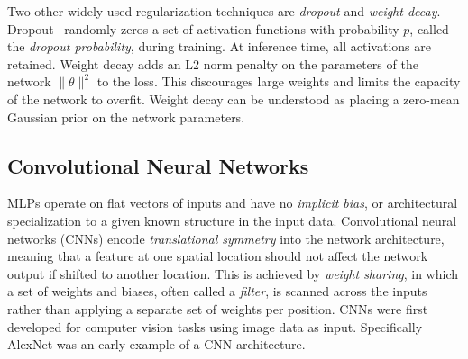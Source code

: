 Two other widely used regularization techniques are \textit{dropout} and \textit{weight decay}.
Dropout~\cite{hinton2012improving} randomly zeros a set of activation functions with probability $p$, called the \textit{dropout probability}, during training.
At inference time, all activations are retained.
Weight decay adds an L2 norm penalty on the parameters of the network $\|\theta\|^2$ to the loss.
This discourages large weights and limits the capacity of the network to overfit.
Weight decay can be understood as placing a zero-mean Gaussian prior on the network parameters.

\subsection{Convolutional Neural Networks}
\label{sec:cnn}

MLPs operate on flat vectors of inputs and have no \textit{implicit bias}, or architectural specialization to a given known structure in the input data.
Convolutional neural networks (CNNs) encode \textit{translational symmetry} into the network architecture, meaning that a feature at one spatial location should not affect the network output if shifted to another location.
This is achieved by \textit{weight sharing}, in which a set of weights and biases, often called a \textit{filter}, is scanned across the inputs rather than applying a separate set of weights per position.
CNNs were first developed for computer vision tasks using image data as input.
Specifically AlexNet was an early example of a CNN architecture.

